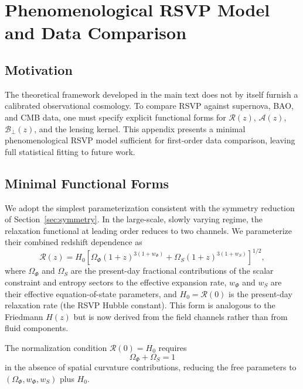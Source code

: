 \documentclass[12pt,a4paper]{article}
\theoremstyle{remark}
\newcommand{\Rcal}{\mathcal{R}}
\newcommand{\Acal}{\mathcal{A}}
\newcommand{\Bcal}{\mathcal{B}}
\begin{document}
\appendix
\section{Phenomenological RSVP Model and Data Comparison}
\label{app:pheno}

\subsection{Motivation}

The theoretical framework developed in the main text does not by itself furnish
a calibrated observational cosmology. To compare RSVP against supernova,
BAO, and CMB data, one must specify explicit functional forms for
$\Rcal(z)$, $\Acal(z)$, $\Bcal_\perp(z)$, and the lensing kernel. This
appendix presents a minimal phenomenological RSVP model sufficient for
first-order data comparison, leaving full statistical fitting to future work.

\subsection{Minimal Functional Forms}

We adopt the simplest parameterization consistent with the symmetry reduction
of Section~\ref{sec:symmetry}. In the large-scale, slowly varying regime, the
relaxation functional at leading order reduces to two channels. We parameterize
their combined redshift dependence as
\begin{equation}
\Rcal(z) = H_0\left[
  \Omega_\Phi (1+z)^{3(1+w_\Phi)}
  + \Omega_S (1+z)^{3(1+w_S)}
\right]^{1/2},
\label{eq:R_pheno}
\end{equation}
where $\Omega_\Phi$ and $\Omega_S$ are the present-day fractional contributions
of the scalar constraint and entropy sectors to the effective expansion rate,
$w_\Phi$ and $w_S$ are their effective equation-of-state parameters, and
$H_0 = \Rcal(0)$ is the present-day relaxation rate (the RSVP Hubble constant).
This form is analogous to the Friedmann $H(z)$ but is now derived from the
field channels rather than from fluid components.

The normalization condition $\Rcal(0) = H_0$ requires
\begin{equation}
\Omega_\Phi + \Omega_S = 1
\end{equation}
in the absence of spatial curvature contributions, reducing the free parameters
to $(\Omega_\Phi, w_\Phi, w_S)$ plus $H_0$.
\end{document}
